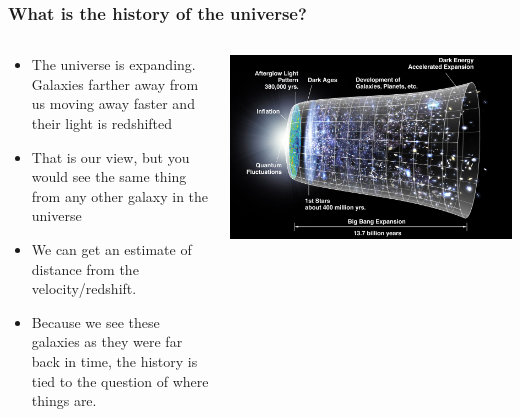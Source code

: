 \documentclass{beamer}
\begin{document}
\frame
{

    \frametitle{What is the history of the universe?}


    \begin{columns}
        \begin{column}{0.5\textwidth}
            \begin{itemize}


                \item The universe is expanding.  Galaxies farther away from
                    us moving away faster and their light is redshifted
                    
                \item That is our view, but you would see the same thing
                    from any other galaxy in the universe

                \item We can get an estimate of distance from the
                    velocity/redshift.
                    
                \item Because we see these galaxies as they were far back in
                    time, the history is tied to the question of where things
                    are.

            \end{itemize}
        \end{column}
        \begin{column}{0.5\textwidth}
            \begin{center}
                \includegraphics[width=\textwidth]{CMB_Timeline300_no_WMAP.jpg}
            \end{center}
            
        \end{column}
    \end{columns}


}
\end{document}

